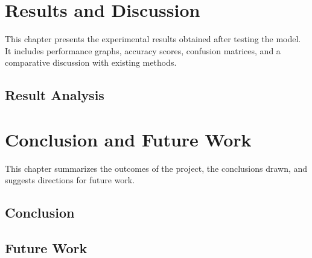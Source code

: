 \documentclass[12pt]{report}
\begin{document}
\newpage

\chapter{Results and Discussion}


This chapter presents the experimental results obtained after testing the model. It includes performance graphs, accuracy scores, confusion matrices, and a comparative discussion with existing methods.


\section{Result Analysis}

\newpage

\chapter{Conclusion and Future Work}

This chapter summarizes the outcomes of the project, the conclusions drawn, and suggests directions for future work.

\section{Conclusion}

\section{Future Work}

\newpage
\end{document}
